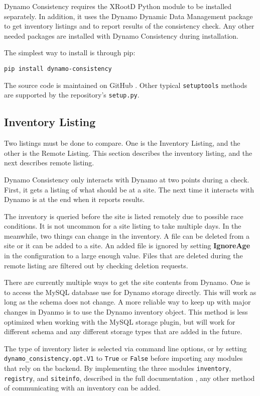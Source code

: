 Dynamo Consistency requires the XRootD \cite{dorigo2005xrootd}
Python module to be installed separately.
In addition, it uses the Dynamo Dynamic Data Management package to get inventory listings
and to report results of the consistency check.
Any other needed packages are installed with Dynamo Consistency during installation.

The simplest way to install is through pip:

\begin{verbatim}
pip install dynamo-consistency
\end{verbatim}

The source code is maintained on GitHub \cite{dynamo_consistency_src}.
Other typical \texttt{setuptools} methods are supported by
the repository’s \texttt{setup.py}.

\subsection{Inventory Listing}

Two listings must be done to compare.
One is the Inventory Listing,
and the other is the Remote Listing.
This section describes the inventory listing, and the next describes remote listing.

Dynamo Consistency only interacts with Dynamo at two points during a check.
First, it gets a listing of what should be at a site.
The next time it interacts with Dynamo is at the end when it reports results.

The inventory is queried before the site is listed remotely due to possible race conditions.
It is not uncommon for a site listing to take multiple days.
In the meanwhile, two things can change in the inventory.
A file can be deleted from a site or it can be added to a site.
An added file is ignored by setting {\bf IgnoreAge}
in the configuration to a large enough value.
Files that are deleted during the remote listing
are filtered out by checking deletion requests.

There are currently multiple ways to get the site contents from Dynamo.
One is to access the MySQL database use for Dynamo storage directly.
This will work as long as the schema does not change.
A more reliable way to keep up with major changes in Dyanmo
is to use the Dynamo inventory object.
This method is less optimized when working with the MySQL storage plugin,
but will work for different schema and any different storage types
that are added in the future.

The type of inventory lister is selected via command line options,
or by setting \texttt{dynamo\_consistency.opt.V1} to \texttt{True} or \texttt{False}
before importing any modules that rely on the backend.
By implementing the three modules \texttt{inventory}, \texttt{registry},
and \texttt{siteinfo}, described in the full documentation \cite{dynamo-consistency},
any other method of communicating with an inventory can be added.

